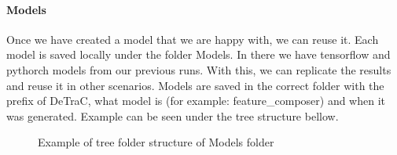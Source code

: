 \paragraph{Models}
Once we have created a model that we are happy with, we can reuse it. Each model is saved locally under the folder Models. In there we have tensorflow and pythorch models from our previous runs. With this, we can replicate the results and reuse it in other scenarios.
\newline
Models are saved in the correct folder with the prefix of DeTraC, what model is (for example: feature{\_}composer) and when it was generated. Example can be seen under the tree structure bellow.

\begin{figure}[!ht]
\caption{Example of tree folder structure of Models folder}
\end{figure}